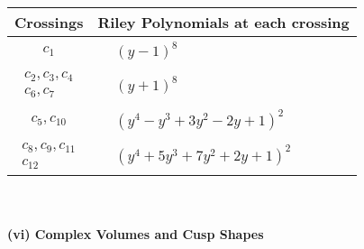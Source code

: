 \documentclass[1p]{elsarticle_modified}
\theoremstyle{definition}
\begin{document}
\begin{tabular}{m{50pt}|m{274pt}}
Crossings & \hspace{64pt}Riley Polynomials at each crossing \\
\hline $$\begin{aligned}c_{1}\end{aligned}$$&$\begin{aligned}
&(y-1)^8
\end{aligned}$\\
\hline $$\begin{aligned}c_{2},c_{3},c_{4}\\c_{6},c_{7}\end{aligned}$$&$\begin{aligned}
&(y+1)^8
\end{aligned}$\\
\hline $$\begin{aligned}c_{5},c_{10}\end{aligned}$$&$\begin{aligned}
&(y^4- y^3+3 y^2-2 y+1)^2
\end{aligned}$\\
\hline $$\begin{aligned}c_{8},c_{9},c_{11}\\c_{12}\end{aligned}$$&$\begin{aligned}
&(y^4+5 y^3+7 y^2+2 y+1)^2
\end{aligned}$\\
\hline
\end{tabular}\\~\\
\newpage\flushleft \textbf{(vi) Complex Volumes and Cusp Shapes}
\end{document}
